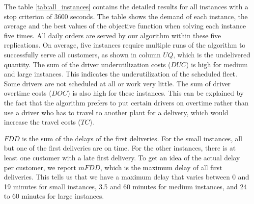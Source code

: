 \documentclass{article}
\begin{document}
The table \ref*{tab:all_instances} contains the detailed results for all instances with a stop criterion of 3600 seconds. The table shows the demand of each instance, the average and the best values of the objective function when solving each instance five times. All daily orders are served by our algorithm within these five replications. On average, five instances require multiple runs of the algorithm to successfully serve all customers, as shown in column $UQ$, which is the undelivered quantity. The sum of the driver underutilization costs ($DUC$) is high for medium and large instances. This indicates the underutilization of the scheduled fleet. Some drivers are not scheduled at all or work very little. The sum of driver overtime costs ($DOC$) is also high for these instances. This can be explained by the fact that the algorithm prefers to put certain drivers on overtime rather than use a driver who has to travel to another plant for a delivery, which would increase the travel costs ($TC$).

$FDD$ is the sum of the delays of the first deliveries.  For the small instances, all but one of the first deliveries are on time. For the other instances, there is at least one customer with a late first delivery.
To get an idea of the actual delay per customer, we report $mFDD$, which is the maximum delay of all first deliveries. This tells us that we have a maximum delay that varies between 0 and 19 minutes for small instances, 3.5 and 60 minutes for medium instances, and 24 to 60 minutes for large instances.
\end{document}
